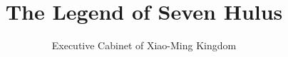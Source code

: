\documentclass[12pt, a4paper]{book}
\title{\textbf{The Legend of Seven Hulus}}
\author{Executive Cabinet of Xiao-Ming Kingdom}
\date{}
\begin{document}
\begin{CJK}{UTF8}{gbsn}

    \maketitle
    \clearpage
    \thispagestyle{empty}

    \frontmatter

    

    \tableofcontents

    \mainmatter

    
    

    \appendix


\end{CJK}
\end{document}
